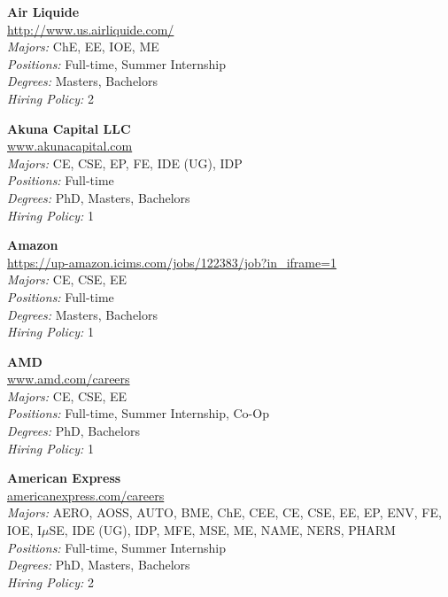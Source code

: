 \documentclass[twoside]{article}
\begin{document}
\begin{center}
\begin{multicols}{3}
\begin{minipage}{.9\columnwidth}{\Large\bf Air Liquide }\\
	\url{http://www.us.airliquide.com/}\\
	\emph{Majors:} ChE, EE, IOE, ME\\
	\emph{Positions:} Full-time, Summer Internship\\
	\emph{Degrees:} Masters, Bachelors\\
	\emph{Hiring Policy:} 2\\
\end{minipage}
 
\begin{minipage}{.9\columnwidth}{\Large\bf Akuna Capital LLC }\\
	\url{www.akunacapital.com}\\
	\emph{Majors:} CE, CSE, EP, FE, IDE (UG), IDP\\
	\emph{Positions:} Full-time\\
	\emph{Degrees:} PhD, Masters, Bachelors\\
	\emph{Hiring Policy:} 1\\
\end{minipage}
 
\begin{minipage}{.9\columnwidth}{\Large\bf Amazon }\\
	\url{https://up-amazon.icims.com/jobs/122383/job?in_iframe=1}\\
	\emph{Majors:} CE, CSE, EE\\
	\emph{Positions:} Full-time\\
	\emph{Degrees:} Masters, Bachelors\\
	\emph{Hiring Policy:} 1\\
\end{minipage}
 
\begin{minipage}{.9\columnwidth}{\Large\bf AMD }\\
	\url{www.amd.com/careers}\\
	\emph{Majors:} CE, CSE, EE\\
	\emph{Positions:} Full-time, Summer Internship, Co-Op\\
	\emph{Degrees:} PhD, Bachelors\\
	\emph{Hiring Policy:} 1\\
\end{minipage}
 
\begin{minipage}{.9\columnwidth}{\Large\bf American Express }\\
	\url{americanexpress.com/careers}\\
	\emph{Majors:} AERO, AOSS, AUTO, BME, ChE, CEE, CE, CSE, EE, EP, ENV, FE, IOE, I$\mu$SE, IDE (UG), IDP, MFE, MSE, ME, NAME, NERS, PHARM\\
	\emph{Positions:} Full-time, Summer Internship\\
	\emph{Degrees:} PhD, Masters, Bachelors\\
	\emph{Hiring Policy:} 2\\
\end{minipage}
 

\end{multicols}
\end{center}
\end{document}
